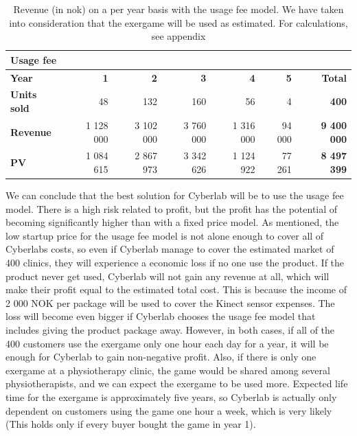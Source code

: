 \begin{table}
 \caption[Revenue with use of Usage Fee Model]{Revenue (in \ac{nok}) on a per year basis with the usage fee model. We have taken into consideration that the exergame will be used as estimated. For calculations, see appendix}
    \begin{tabular}{|l|r|r|r|r|r|r|}
        \hline
       \textbf{Usage fee}  & & & & & & \\ \hline
      \textbf{Year} & \textbf{1} & \textbf{2} & \textbf{3} & \textbf{4} & \textbf{5} & \textbf{Total}\\ \hline
	   \textbf{Units sold} & 48 & 132 & 160 & 56 & 4 & \textbf{400}\\ \hline
	   \textbf{Revenue} & 1 128 000 & 3 102 000 & 3 760 000 & 1 316 000 & 94 000 & \textbf{9 400 000} \\ \hline  
	   \textbf{PV} & 1 084 615 & 2 867 973 & 3 342 626 & 1 124 922 & 77 261 & \textbf{8 497 399}  \\ \hline
    \end{tabular}
    \label{tab:revusage}
\end{table}
We can conclude that the best solution for Cyberlab will be to use the usage fee model. There is a high risk related to profit, but the profit has the potential of becoming significantly higher than with a fixed price model. As mentioned, the low startup price for the usage fee model is not alone enough to cover all of Cyberlabs costs, so even if Cyberlab manage to cover the estimated market of 400 clinics, they will experience a economic loss if no one use the product. If the product never get used, Cyberlab will not gain any revenue at all, which will make their profit equal to the estimated total cost. This is because the income of 2 000 NOK per package will be used to cover the Kinect sensor expenses. The loss will become even bigger if Cyberlab chooses the usage fee model that includes giving the product package away. However, in both cases, if all of the 400 customers use the exergame only one hour each day for a year, it will be enough for Cyberlab to gain non-negative profit. Also, if there is only one exergame at a physiotherapy clinic, the game would be shared among several physiotherapists, and we can expect the exergame to be used more. Expected life time for the exergame is approximately five years, so Cyberlab is actually only dependent on customers using the game one hour a week, which is very likely (This holds only if every buyer bought the game in year 1). \\ \\   
